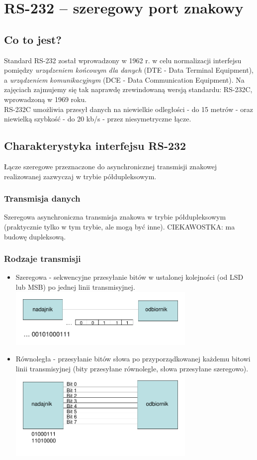 \section{RS-232 – szeregowy port znakowy}
	\subsection{Co to jest?}
	Standard RS-232 został wprowadzony w 1962 r. w celu normalizacji interfejsu pomiędzy \textit{urządzeniem końcowym dla danych} (DTE - Data Terminal Equipment), a \textit{urządzeniem komunikacyjnym} (DCE - Data Communication Equipment). Na zajęciach zajmujemy się tak naprawdę zrewindowaną wersją standardu: RS-232C, wprowadzoną w 1969 roku.\\
	RS-232C umożliwia przesył danych na niewielkie odległości - do 15 metrów - oraz niewielką szybkość - do 20 kb/s - przez niesymetryczne łącze.
	\subsection{Charakterystyka interfejsu RS-232}
		Łącze szeregowe przeznaczone do asynchronicznej transmisji znakowej realizowanej zazwyczaj w trybie półdupleksowym.
		\subsubsection{Transmisja danych}
		Szeregowa asynchroniczna transmisja znakowa w trybie półdupleksowym (praktycznie tylko w tym trybie, ale mogą być inne). CIEKAWOSTKA: ma budowę dupleksową.
		\subsubsection{Rodzaje transmisji}
		\begin{itemize}
			\item Szeregowa - sekwencyjne przesyłanie bitów w ustalonej kolejności (od LSD lub MSB) po jednej linii transmisyjnej.\\
			\includegraphics[width=9cm]{./wyklady/RS232_2_1.pdf}
			\item Równoległa - przesyłanie bitów słowa po przyporządkowanej każdemu bitowi linii transmisyjnej (bity przesyłane równolegle, słowa przesyłane szeregowo).\\
			\includegraphics[width=9cm]{./wyklady/RS232_2_2.pdf}
		\end{itemize}
